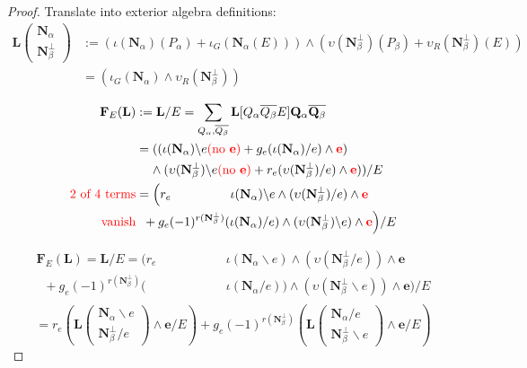 \documentclass[Unicode]{cedram-alco}
\newcommand{\ext}[1]{\ensuremath{\mathbf{#1}}}
\newcommand{\eNal}{\ensuremath{\ext{N}_{\alpha}}}
\newcommand{\eNbePe}{\ensuremath{\ext{N}_{\beta}^{\perp}}}
\newcommand{\Is}{\ensuremath{\iota}}
\newcommand{\Vs}{\ensuremath{\upsilon}}
\newcommand{\alert}[1]{{\color{red}#1}}
\begin{document}
\begin{proof}

  Translate into exterior algebra definitions:
\[
\begin{split}
  \ext{L}\left( \begin{array}{c} \eNal\\ \eNbePe \end{array} \right)
   & := (\Is(\eNal)(P_\alpha) + \Is_G(\eNal(E)))\wedge(\Vs(\eNbePe)(P_\beta) + \Vs_R(\eNbePe)(E)) \\
  &  = (\Is_G(\eNal)\wedge\Vs_R(\eNbePe))
\end{split}
\]

\[
\begin{split}
  \ext{F}_E(\ext{L})& := \ext{L}/E = \sum_{Q_\alpha,\overline{Q_\beta}}\ext{L}[Q_\alpha \overline{Q_\beta} E]\ext{Q}_\alpha\overline{\ext{Q}_\beta} \\
  & =   ((\Is(\eNal)\backslash   e\alert{(\text{no\ }\ext{e})} + g_e(\Is(\eNal)/e)\wedge\alert{\ext{e}})                   \\
  & \;\;\;\;  \wedge  (\Vs(\eNbePe)\backslash e\alert{(\text{no\ }\ext{e})} + r_e(\Vs(\eNbePe)/e)\wedge \alert{\ext{e}}) ) / E \\
\alert{\text{2 of 4 terms}}  & = \Big( r_e  \;\;\; \;\;\;\;\;\;\;\;\;\;\;\;\;\; \Is(\ext{\eNal})\backslash e\wedge (\Vs(\eNbePe)/e)      \wedge  \alert{\ext{e}} \\
\alert{\text{vanish}}  & \;\;+ g_e (-1)^{r(\eNbePe)}(\Is(\eNal)/e)\wedge(\Vs(\eNbePe)\backslash e)    \wedge  \alert{\ext{e}}\Big) / E 
  \end{split}
\]
 



\[
\begin{split}
  \ext{F}_E(\ext{L}) = \ext{L}/E 
   = \Big( r_e  \;\;\; \;\;\;\;\;\;\;\;\;\;\;\;\;\; & \Is(\eNal\backslash e)  \wedge (\Vs(\eNbePe/e))      \wedge  \ext{e} \\
   \;\;+ g_e (-1)^{r(\eNbePe)} ( & \Is(\eNal/e))\wedge(\Vs(\eNbePe\backslash e))   \wedge  \ext{e}\Big) / E \\
\end{split}
\]
\[  = r_e\left(\ext{L}\left(\begin{array}{c} \eNal\backslash e \\
    \eNbePe/e  \end{array} \right)  \wedge \ext{e} /E \right) +
   g_e(-1)^{r(\eNbePe)}\left(\ext{L}\left(\begin{array}{c} \eNal /e \\
    \eNbePe \backslash e \end{array} \right) \wedge \ext{e} /E \right)
   \]
   

\end{proof}
\end{document}
